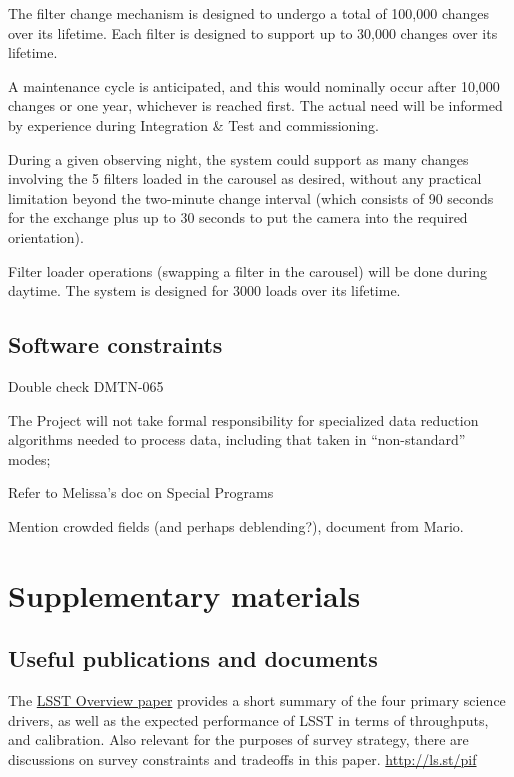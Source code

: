 \documentclass[DM,lsstdraft,toc,usenatbib]{lsstdoc}
\begin{document}
The filter change mechanism is designed to undergo a total of 100,000 changes over its lifetime. Each filter is designed to support up to 30,000 changes over its lifetime.

A maintenance cycle is anticipated, and this would nominally occur after 10,000 changes or one year, whichever is reached first. The actual need will be informed by experience during Integration \& Test and commissioning.

During a given observing night, the system could support as many changes involving the 5 filters loaded in the carousel as desired, without any practical limitation beyond the two-minute change interval (which consists of 90 seconds for the exchange plus up to 30 seconds to put the camera into the required orientation). 

Filter loader operations (swapping a filter in the carousel) will be done during daytime. The system is designed for 3000 loads over its lifetime. 




\subsection{Software constraints} 

Double check DMTN-065

The Project will not take formal responsibility for specialized data reduction algorithms 
needed to process data, including that taken in ``non-standard'' modes; 
   
Refer to Melissa's doc on Special Programs 

Mention crowded fields (and perhaps deblending?), document from Mario. 



\section{Supplementary materials} 


\subsection{Useful publications and documents}

The \href{https://www.lsst.org/content/lsst-science-drivers-reference-design-and-anticipated-data-products}{LSST Overview paper} provides a short summary of the four primary science drivers, as well as the expected performance of LSST in terms of throughputs, and calibration. Also relevant for the purposes of survey strategy, there are discussions on survey constraints and tradeoffs in this paper.  \url{http://ls.st/pif}
\end{document}
